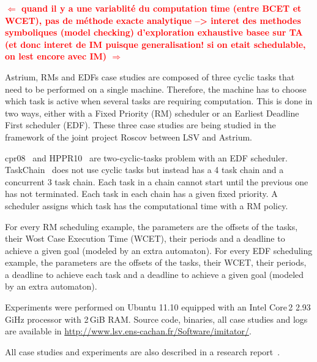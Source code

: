 \documentclass{llncs}
\newcommand{\commentaire}[1]{\textcolor{red}{\textbf{$\Leftarrow$  #1 $\Rightarrow$}}}
\begin{document}
\commentaire{
quand il y a une variablité du computation time (entre BCET et WCET), pas de méthode exacte analytique --> interet des methodes symboliques (model checking) d'exploration exhaustive basee sur TA (et donc interet de IM puisque generalisation! si on etait schedulable, on lest encore avec IM)
}

Astrium, RMs and EDFs case studies are composed of three cyclic tasks that need to be performed on a single machine.
	Therefore, the machine has to choose which task is active when several tasks are requiring computation.
	This is done in two ways, either with a Fixed Priority (RM) scheduler or an Earliest Deadline First scheduler (EDF).
	These three case studies are being studied in the framework of the joint project Roscov between LSV and Astrium.
	
cpr08~\cite{cpr08} and HPPR10~\cite{LPPRC10} are two-cyclic-tasks problem with an EDF scheduler.
	TaskChain~\cite{SGL97} does not use cyclic tasks but instead has a 4 task chain and a concurrent 3 task chain.
		Each task in a chain cannot start until the previous one has not terminated.
		Each task in each chain has a given fixed priority.
		A scheduler assigns which task has the computational time with a RM policy.

For every RM scheduling example, the parameters are the offsets of the tasks, their Wost Case Execution Time (WCET), their periods and a deadline to achieve a given goal (modeled by an extra automaton).
	For every EDF scheduling example, the parameters are the offsets of the tasks, their WCET, their periods, a deadline to achieve each task and a deadline to achieve a given goal (modeled by an extra automaton).



Experiments were performed on Ubuntu 11.10 equipped with an Intel Core\,2 2.93\,GiHz processor with 2\,GiB RAM.
Source code, binaries, all case studies and logs are available in
\url{http://www.lsv.ens-cachan.fr/Software/imitator/}.

All case studies and experiments are also described in a research report~\cite{soulat12}.





\end{document}
